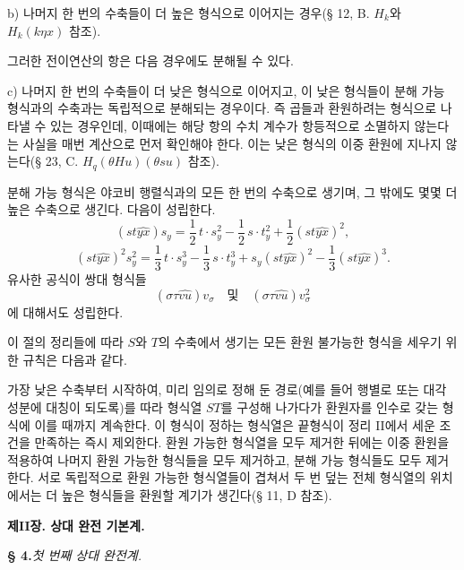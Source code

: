 b) 나머지 한 번의 수축들이 더 높은 형식으로 이어지는 경우(§ 12, B. $H_k$와 $H_k(k\eta x)$ 참조).

그러한 전이연산의 항은 다음 경우에도 분해될 수 있다.

c) 나머지 한 번의 수축들이 더 낮은 형식으로 이어지고, 이 낮은 형식들이 분해 가능 형식과의 수축과는 독립적으로 분해되는 경우이다. 즉 곱들과 환원하려는 형식으로 나타낼 수 있는 경우인데, 이때에는 해당 항의 수치 계수가 항등적으로 소멸하지 않는다는 사실을 매번 계산으로 먼저 확인해야 한다. 이는 낮은 형식의 \glqq{}이중 환원\grqq{}에 지나지 않는다(§ 23, C. $H_q(\theta H u)(\theta s u)$ 참조).

분해 가능 형식은 야코비 행렬식과의 모든 한 번의 수축으로 생기며, 그 밖에도 몇몇 더 높은 수축으로 생긴다. 다음이 성립한다.
\[
(st\widehat{yx})s_y=\frac12\,t\cdot s_y^2-\frac12\,s\cdot t_y^2+\frac12(st\widehat{yx})^2,
\]
\[
(st\widehat{yx})^2s_y^2=\frac13\,t\cdot s_y^3-\frac13\,s\cdot t_y^3+s_y(st\widehat{yx})^2-\frac13(st\widehat{yx})^3.
\]
유사한 공식이 쌍대 형식들
\[
(\sigma\tau\widehat{vu})v_\sigma
\quad\text{및}\quad
(\sigma\tau\widehat{vu})v_\sigma^2
\]
에 대해서도 성립한다.

이 절의 정리들에 따라 $S$와 $T$의 수축에서 생기는 모든 환원 불가능한 형식을 세우기 위한 규칙은 다음과 같다.

가장 낮은 수축부터 시작하여, 미리 임의로 정해 둔 경로(예를 들어 행별로 또는 대각 성분에 대칭이 되도록)를 따라 형식열 $ST$를 구성해 나가다가 환원자를 인수로 갖는 형식에 이를 때까지 계속한다. 이 형식이 정하는 형식열은 끝형식이 정리 II에서 세운 조건을 만족하는 즉시 제외한다. 환원 가능한 형식열을 모두 제거한 뒤에는 이중 환원을 적용하여 나머지 환원 가능한 형식들을 모두 제거하고, 분해 가능 형식들도 모두 제거한다. 서로 독립적으로 환원 가능한 형식열들이 겹쳐서 두 번 덮는 전체 형식열의 위치에서는 더 높은 형식들을 환원할 계기가 생긴다(§ 11, D 참조).

\begin{center}
\textbf{제II장. \quad 상대 완전 기본계.}

\textbf{§ 4.}\quad\emph{첫 번째 상대 완전계.}
\end{center}

